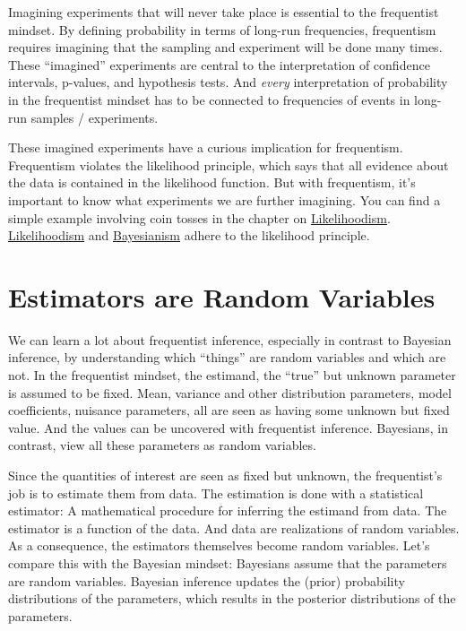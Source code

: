 \documentclass[
  10pt,
]{scrbook}
\begin{document}
Imagining experiments that will never take place is essential to the frequentist mindset.
By defining probability in terms of long-run frequencies, frequentism requires imagining that the sampling and experiment will be done many times.
These ``imagined'' experiments are central to the interpretation of confidence intervals, p-values, and hypothesis tests.
And \emph{every} interpretation of probability in the frequentist mindset has to be connected to frequencies of events in long-run samples / experiments.

These imagined experiments have a curious implication for frequentism.
Frequentism violates the likelihood principle, which says that all evidence about the data is contained in the likelihood function.
But with frequentism, it's important to know what experiments we are further imagining.
You can find a simple example involving coin tosses in the chapter on \protect\hyperlink{likelihoodism}{Likelihoodism}.
\protect\hyperlink{likelihoodism}{Likelihoodism} and \protect\hyperlink{bayesianism-inference}{Bayesianism} adhere to the likelihood principle.

\hypertarget{estimators-are-random-variables}{%
\section{Estimators are Random Variables}\label{estimators-are-random-variables}}

We can learn a lot about frequentist inference, especially in contrast to Bayesian inference, by understanding which ``things'' are random variables and which are not.
In the frequentist mindset, the estimand, the ``true'' but unknown parameter is assumed to be fixed.
Mean, variance and other distribution parameters, model coefficients, nuisance parameters, all are seen as having some unknown but fixed value.
And the values can be uncovered with frequentist inference.
Bayesians, in contrast, view all these parameters as random variables.

Since the quantities of interest are seen as fixed but unknown, the frequentist's job is to estimate them from data.
The estimation is done with a statistical estimator: A mathematical procedure for inferring the estimand from data.
The estimator is a function of the data.
And data are realizations of random variables.
As a consequence, the estimators themselves become random variables.
Let's compare this with the Bayesian mindset:
Bayesians assume that the parameters are random variables.
Bayesian inference updates the (prior) probability distributions of the parameters, which results in the posterior distributions of the parameters.
\end{document}
